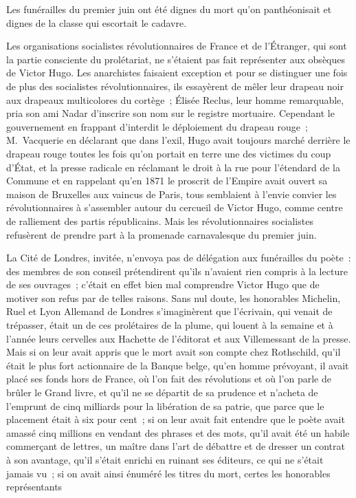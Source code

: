 \documentclass[french,twoside]{book} %
\begin{document}
Les funérailles du premier juin ont été dignes du mort qu’on panthéonisait et dignes de la classe qui escortait le cadavre.\par
Les organisations socialistes révolutionnaires de France et de l’Étranger, qui sont la partie consciente du prolétariat, ne s’étaient pas fait représenter aux obsèques de Victor Hugo. Les anarchistes faisaient exception et pour se distinguer une fois de plus des socialistes révolutionnaires, ils essayèrent de mêler leur drapeau noir aux drapeaux multicolores du cortège ; Élisée Reclus, leur homme remarquable, pria son ami Nadar d’inscrire son nom sur le registre mortuaire. Cependant le gouvernement en frappant d’interdit le déploiement du drapeau rouge ; M. Vacquerie en déclarant que dans l’exil, Hugo avait toujours marché derrière le drapeau rouge toutes les fois qu’on portait en terre une des victimes du coup d’État, et la presse radicale en réclamant le droit à la rue pour l’étendard de la Commune et en rappelant qu’en 1871 le proscrit de l’Empire avait ouvert sa maison de Bruxelles aux vaincus de Paris, tous semblaient à l’envie convier les révolutionnaires à s’assembler  
\label{p7}autour du cercueil de Victor Hugo, comme centre de ralliement des partis républicains. Mais les révolutionnaires socialistes refusèrent de prendre part à la promenade carnavalesque du premier juin.\par
La Cité de Londres, invitée, n’envoya pas de délégation aux funérailles du poète : des membres de son conseil prétendirent qu’ils n’avaient rien compris à la lecture de ses ouvrages ; c’était en effet bien mal comprendre Victor Hugo que de motiver son refus par de telles raisons. Sans nul doute, les honorables Michelin, Ruel et Lyon Allemand de Londres s’imaginèrent que l’écrivain, qui venait de trépasser, était un de ces prolétaires de la plume, qui louent à la semaine et à l’année leurs cervelles aux Hachette de l’éditorat et aux Villemessant de la presse. Mais si on leur avait appris que le mort avait son compte chez Rothschild, qu’il était le plus fort actionnaire de la Banque belge, qu’en homme prévoyant, il avait placé ses fonds hors de France, où l’on fait des révolutions et où l’on parle de brûler le Grand livre, et qu’il ne se départit de sa prudence et n’acheta de l’emprunt de cinq milliards pour la libération de sa patrie, que parce que le placement était à six pour cent ; si on leur avait fait entendre que le poète avait amassé cinq millions en vendant des phrases et des mots, qu’il avait été un habile commerçant de lettres, un maître dans l’art de débattre et de dresser un contrat à son avantage, qu’il s’était enrichi en ruinant ses éditeurs, ce qui ne s’était jamais vu ; si on avait ainsi énuméré les titres du mort, certes les honorables représentants  
\end{document}
